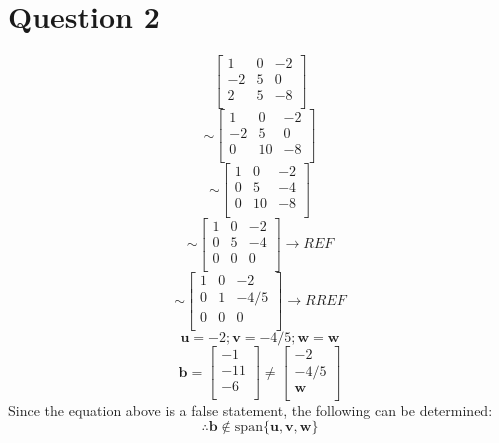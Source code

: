 \documentclass{report}
\begin{document}
\section*{Question 2}
\begin{equation}
\begin{bmatrix}
1 & 0 & -2 \\ 
-2 & 5 & 0 \\ 
2 & 5 & -8 \\ 
\end{bmatrix}
\end{equation}
\begin{equation}
\sim
\begin{bmatrix}
1 & 0 & -2 \\ 
-2 & 5 & 0 \\ 
0 & 10 & -8 \\ 
\end{bmatrix}
\end{equation}
\begin{equation}
\sim
\begin{bmatrix}
1 & 0 & -2 \\ 
0 & 5 & -4 \\ 
0 & 10 & -8 \\ 
\end{bmatrix}
\end{equation}
\begin{equation}
\sim
\begin{bmatrix}
1 & 0 & -2 \\ 
0 & 5 & -4 \\ 
0 & 0 & 0 \\ 
\end{bmatrix}
\rightarrow
REF
\end{equation}
\begin{equation}
\sim
\begin{bmatrix}
1 & 0 & -2 \\ 
0 & 1 & -4/5 \\ 
0 & 0 & 0 \\ 
\end{bmatrix}
\rightarrow
RREF
\end{equation}
\begin{equation*}
\mathbf{u}
=-2;
\mathbf{v}
=-4/5;
\mathbf{w}
=
\mathbf{w}
\end{equation*}
\begin{equation}
\textbf{b}
=
\begin{bmatrix}
-1 \\ 
-11 \\ 
-6 \\ 
\end{bmatrix}
\neq
\begin{bmatrix}
-2 \\ 
-4/5 \\ 
\mathbf{w} \\ 
\end{bmatrix}
\end{equation}
Since the equation above is a false statement, the following can be determined:
\begin{equation}
\therefore
\textbf{b}
\notin
\mathrm{span}\{\mathbf{u}, \mathbf{v}, \mathbf{w}\}
\end{equation}
\end{document}
